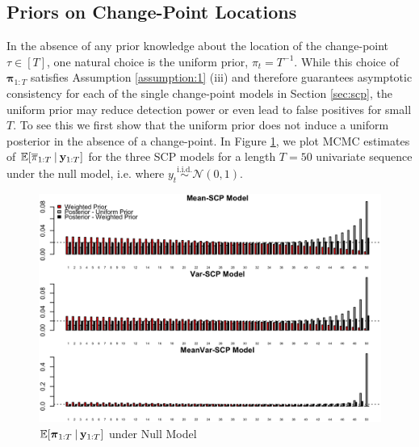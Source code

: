 \subsection{Priors on Change-Point Locations}

\label{app:prior}

In the absence of any prior knowledge about the location of the change-point $\tau \in [T]$, one natural choice is the uniform prior, $\pi_t = T^{-1}$. While this choice of $\boldsymbol{\pi}_{1:T}$ satisfies Assumption \ref{assumption:1} (iii) and therefore guarantees asymptotic consistency for each of the single change-point models in Section \ref{sec:scp}, the uniform prior may reduce detection power or even lead to false positives for small $T$. To see this we first show that the uniform prior does not induce a uniform posterior in the absence of a change-point. In Figure \ref{fig:post-probs-plot}, we plot MCMC estimates of $\mathbb{E}[\overline{\pi}_{1:T} \:|\: \mathbf{y}_{1:T}]$ for the three SCP models for a length $T=50$ univariate sequence under the null model, i.e. where $y_t \overset{\text{i.i.d.}}{\sim}\mathcal{N}(0,1)$. 
\begin{figure}[!h]
    \centering
    \includegraphics[scale = 0.27]{MICH/Figures/prior_choice_plot.png}
    \caption{$\mathbb{E}[\boldsymbol{\pi}_{1:T}\:|\: \mathbf{y}_{1:T}]$ under Null Model}
    \label{fig:post-probs-plot}
\end{figure}

